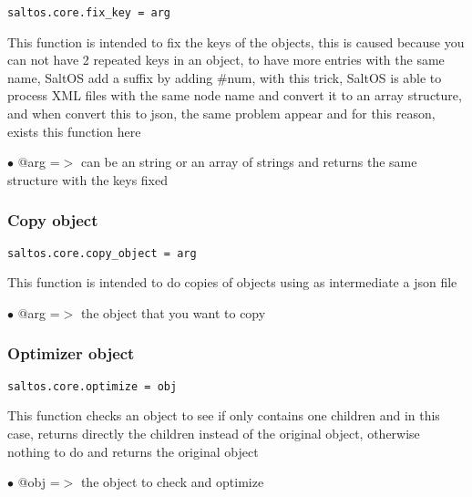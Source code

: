 \documentclass[a4paper]{article}
\begin{document}
\begin{lstlisting}
saltos.core.fix_key = arg
\end{lstlisting}

This function is intended to fix the keys of the objects, this is caused because you can not
have 2 repeated keys in an object, to have more entries with the same name, SaltOS add a suffix
by adding \#num, with this trick, SaltOS is able to process XML files with the same node name
and convert it to an array structure, and when convert this to json, the same problem appear and
for this reason, exists this function here

\begin{compactitem}
\item[\color{myblue}$\bullet$] @arg =$>$ can be an string or an array of strings and returns the same structure with the keys fixed
\end{compactitem}

\hypertarget{toc705}{}
\subsubsection{Copy object}

\begin{lstlisting}
saltos.core.copy_object = arg
\end{lstlisting}

This function is intended to do copies of objects using as intermediate a json file

\begin{compactitem}
\item[\color{myblue}$\bullet$] @arg =$>$ the object that you want to copy
\end{compactitem}

\hypertarget{toc706}{}
\subsubsection{Optimizer object}

\begin{lstlisting}
saltos.core.optimize = obj
\end{lstlisting}

This function checks an object to see if only contains one children and in this case, returns
directly the children instead of the original object, otherwise nothing to do and returns the
original object

\begin{compactitem}
\item[\color{myblue}$\bullet$] @obj =$>$ the object to check and optimize
\end{compactitem}
\end{document}
